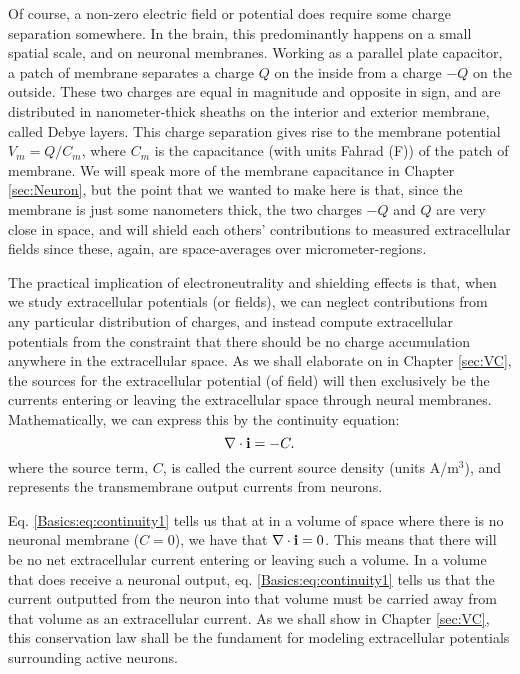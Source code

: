 Of course, a non-zero electric field or potential does require some charge separation somewhere. In the brain, this predominantly happens on a small spatial scale, and on neuronal membranes. Working as a parallel plate capacitor, a patch of membrane separates a charge $Q$ on the inside from a charge $-Q$ on the outside. These two charges are equal in magnitude and opposite in sign,
and are distributed in nanometer-thick sheaths on the interior and exterior membrane, called Debye layers. This charge separation gives rise to the membrane potential $V_m = Q/C_m$, where $C_m$ is the capacitance (with units Fahrad (F)) of the patch of membrane. We will speak more of the membrane capacitance in Chapter \ref{sec:Neuron}, but the point that we wanted to make here is that, since the membrane is just some nanometers thick, the two charges $-Q$ and $Q$ are very close in space, and will shield each others' contributions to measured extracellular fields since these, again, are space-averages over micrometer-regions.

The practical implication of electroneutrality and shielding effects is that, when we study extracellular potentials (or fields), we can neglect contributions from any particular distribution of charges, and instead compute extracellular potentials from the constraint that there should be no charge accumulation anywhere in the extracellular space. As we shall elaborate on in Chapter \ref{sec:VC}, the sources for the extracellular potential (of field) will then exclusively be the currents entering or leaving the extracellular space through neural membranes. Mathematically, we can express this by the continuity equation:
\begin{equation}
\nabla \cdot {\bf i} = -C.
\label{Basics:eq:continuity1}
\end{equation}
where the source term, $C$, is called the current source density (units A/m$^3$), and represents the transmembrane output currents from neurons. 

Eq. \ref{Basics:eq:continuity1} tells us that at in a volume of space where there is no neuronal membrane ($C = 0$), we have that $\nabla \cdot {\bf i} = 0$. This means that there will be no net extracellular current entering or leaving such a volume. In a volume that does receive a neuronal output, eq. \ref{Basics:eq:continuity1} tells us that the current outputted from the neuron into that volume must be carried away from that volume as an extracellular current. As we shall show in Chapter \ref{sec:VC}, this conservation law shall be the fundament for modeling extracellular potentials surrounding active neurons.

